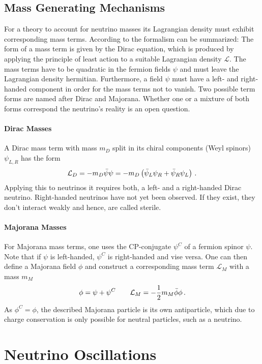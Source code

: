 \subsection{Mass Generating Mechanisms}
For a theory to account for neutrino masses its Lagrangian density must exhibit corresponding mass terms. According to \cite{zuber2011neutrino} the formalism can be summarized: The form of a mass term is given by the Dirac equation, which is produced by applying the principle of least action to a suitable Lagrangian density $\mathcal{L}$. The mass terms have to be quadratic in the fermion fields $\psi$ and must leave the Lagrangian density hermitian. Furthermore, a field $\psi$ must have a left- and right-handed component in order for the mass terms not to vanish. Two possible term forms are named after Dirac and Majorana. Whether one or a mixture of both forms correspond the neutrino's reality is an open question.

\paragraph{Dirac Masses}
A Dirac mass term with mass $m_D$ split in its chiral components (Weyl spinors) $\psi_{L,R}$ has the form
\begin{equation}
    \mathcal{L}_D =  -m_D \bar\psi\psi = -m_D \left(\bar\psi_L\psi_R + \bar\psi_R\psi_L \right) \text{\,.}
\end{equation}
Applying this to neutrinos it requires both, a left- and a right-handed Dirac neutrino. Right-handed neutrinos have not yet been observed. If they exist, they don't interact weakly and hence, are called sterile.
\paragraph{Majorana Masses}
For Majorana mass terms, one uses the CP-conjugate $\psi^C$ of a fermion spinor $\psi$. Note that if $\psi$ is left-handed, $\psi^C$ is right-handed and vise versa. One can then define a Majorana field $\phi$ and construct a corresponding mass term $\mathcal{L}_M$ with a mass $m_M$
\begin{equation}
    \phi = \psi + \psi^C \qquad \mathcal{L}_M = -\frac{1}{2}m_M \bar\phi \phi \text{\,.}
\end{equation}
As $\phi^C=\phi$, the described Majorana particle is its own antiparticle, which due to charge conservation is only possible for neutral particles, such as a neutrino.

\section{Neutrino Oscillations}
